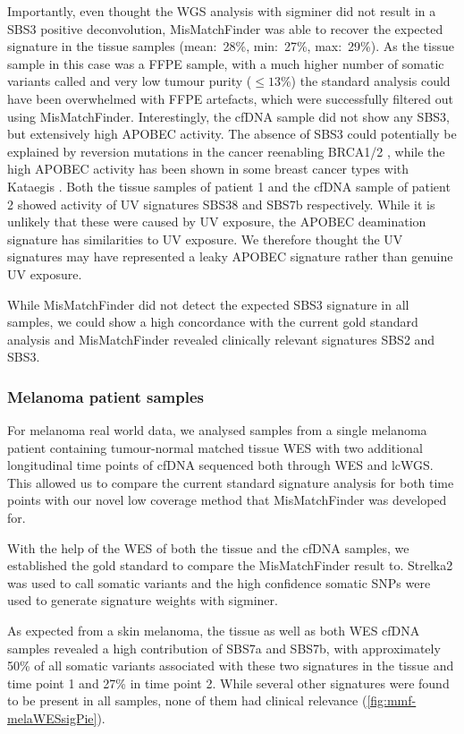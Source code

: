 Importantly, even thought the WGS analysis with sigminer did not result in a SBS3 positive deconvolution, MisMatchFinder was able to recover the expected signature in the tissue samples (mean:~28\%, min:~27\%, max:~29\%). As the tissue sample in this case was a FFPE sample, with a much higher number of somatic variants called and very low tumour purity ($\leq 13\%$) the standard analysis could have been overwhelmed with FFPE artefacts, which were successfully filtered out using MisMatchFinder. Interestingly, the cfDNA sample did not show any SBS3, but extensively high APOBEC activity. The absence of SBS3 could potentially be explained by reversion mutations in the cancer reenabling BRCA1/2 \cite{Lin2018a}, while the high APOBEC activity has been shown in some breast cancer types with Kataegis \cite{Alexandrov2020,Rebhandl2015}. Both the tissue samples of patient 1 and the cfDNA sample of patient 2 showed activity of UV signatures SBS38 and SBS7b respectively. While it is unlikely that these were caused by UV exposure, the APOBEC deamination signature has similarities to UV exposure. We therefore thought the UV signatures may have represented a leaky APOBEC signature rather than genuine UV exposure.

While MisMatchFinder did not detect the expected SBS3 signature in all samples, we could show a high concordance with the current gold standard analysis and MisMatchFinder revealed clinically relevant signatures SBS2 and SBS3. 

\subsubsection{Melanoma patient samples}
\label{mmf-sec:melpatients}

For melanoma real world data, we analysed samples from a single melanoma patient containing tumour-normal matched tissue WES with two additional longitudinal time points of cfDNA sequenced both through WES and lcWGS. This allowed us to compare the current standard signature analysis for both time points with our novel low coverage method that MisMatchFinder was developed for.

With the help of the WES of both the tissue and the cfDNA samples, we established the gold standard to compare the MisMatchFinder result to.  Strelka2 was used to call somatic variants and the high confidence somatic SNPs were used to generate signature weights with sigminer.

As expected from a skin melanoma, the tissue as well as both WES cfDNA samples revealed a high contribution of SBS7a and SBS7b, with approximately 50\%  of all somatic variants associated with these two signatures in the tissue and time point 1 and 27\% in time point 2. While several other signatures were found to be present in all samples, none of them had clinical relevance (\autoref{fig:mmf-melaWESsigPie}).

